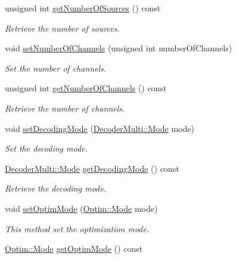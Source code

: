 \begin{DoxyCompactItemize}
unsigned int \hyperlink{class_hoa2_d_1_1_kit_sources_a99c6ab13cc6cee481ec1c8409c0edcd2}{get\-Number\-Of\-Sources} () const 
\begin{DoxyCompactList}\small\item\em Retrieve the number of sources. \end{DoxyCompactList}\item 
void \hyperlink{class_hoa2_d_1_1_kit_sources_a520c92bfb902421cdf918db8e5c44a98}{set\-Number\-Of\-Channels} (unsigned int number\-Of\-Channels)
\begin{DoxyCompactList}\small\item\em Set the number of channels. \end{DoxyCompactList}\item 
unsigned int \hyperlink{class_hoa2_d_1_1_kit_sources_acdbcf156e13c464bfa6170159a010e7b}{get\-Number\-Of\-Channels} () const 
\begin{DoxyCompactList}\small\item\em Retrieve the number of channels. \end{DoxyCompactList}\item 
void \hyperlink{class_hoa2_d_1_1_kit_sources_ae7fa3953e7cc635cd8f78c577fb97787}{set\-Decoding\-Mode} (\hyperlink{class_hoa2_d_1_1_decoder_multi_a0ac23d6bd77378d9cd5ddf6e71029300}{Decoder\-Multi\-::\-Mode} mode)
\begin{DoxyCompactList}\small\item\em Set the decoding mode. \end{DoxyCompactList}\item 
\hyperlink{class_hoa2_d_1_1_decoder_multi_a0ac23d6bd77378d9cd5ddf6e71029300}{Decoder\-Multi\-::\-Mode} \hyperlink{class_hoa2_d_1_1_kit_sources_ab12f76a830bf2631c55a4a97e4853cd2}{get\-Decoding\-Mode} () const 
\begin{DoxyCompactList}\small\item\em Retrieve the decoding mode. \end{DoxyCompactList}\item 
void \hyperlink{class_hoa2_d_1_1_kit_sources_a3bf1b6653bbd86c90ba4eafc67e2758e}{set\-Optim\-Mode} (\hyperlink{class_hoa2_d_1_1_optim_ae40f22368cb55699cf19729e37c0aff3}{Optim\-::\-Mode} mode)
\begin{DoxyCompactList}\small\item\em This method set the optimization mode. \end{DoxyCompactList}\item 
\hyperlink{class_hoa2_d_1_1_optim_ae40f22368cb55699cf19729e37c0aff3}{Optim\-::\-Mode} \hyperlink{class_hoa2_d_1_1_kit_sources_a7e9b104e0af960af627f7f041706ddb0}{get\-Optim\-Mode} () const 

\end{DoxyCompactItemize}
